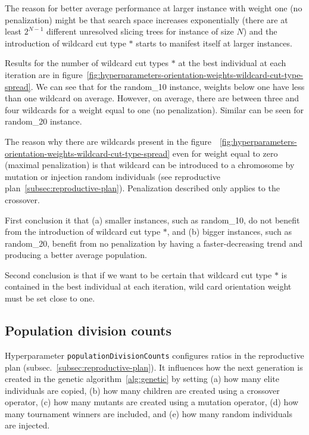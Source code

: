 The reason for better average performance at larger instance with weight one (no penalization) might
be that search space increases exponentially (there are at least $2^{N-1}$ different unresolved slicing trees for instance of size $N$) and the introduction of wildcard cut type $*$ starts to manifest itself
at larger instances.

Results for the number of wildcard cut types $*$ at the best individual at each iteration are in
figure~\ref{fig:hyperparameters-orientation-weights-wildcard-cut-type-spread}.
We can see that for the random\_10 instance, weights below one have less than one wildcard on average.
However, on average, there are between three and four wildcards for a weight equal to one (no penalization).
Similar can be seen for random\_20 instance.

The reason why there are wildcards present in the figure~~\ref{fig:hyperparameters-orientation-weights-wildcard-cut-type-spread}
even for weight equal to zero (maximal penalization) is that wildcard can be introduced to a chromosome by mutation
or injection random individuals (see reproductive plan~\ref{subsec:reproductive-plan}).
Penalization described only applies to the crossover.

First conclusion it that (a) smaller instances, such as random\_10, do not benefit from the introduction of wildcard cut type $*$,
and (b) bigger instances, such as random\_20, benefit from no penalization by having a faster-decreasing trend and producing a better average population.

Second conclusion is that if we want to be certain that wildcard cut type $*$ is contained in the best individual at each iteration,
wild card orientation weight must be set close to one.

\subsection{Population division counts}\label{subsec:population-division-counts}
Hyperparameter \verb|populationDivisionCounts| configures ratios in the reproductive plan (subsec.~\ref{subsec:reproductive-plan}).
It influences how the next generation is created in the genetic algorithm~\ref{alg:genetic}
by setting (a) how many elite individuals are copied, (b) how many children are created using a crossover operator,
(c) how many mutants are created using a mutation operator, (d) how many tournament winners are included,
and (e) how many random individuals are injected.

